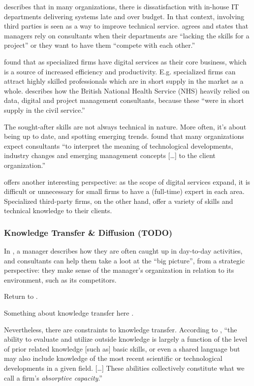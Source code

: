 \documentclass[12pt]{article}
\begin{document}
\citet[12]{lacity1994} describes that in many organizations, there is
dissatisfaction with in-house IT departments delivering systems late and
over budget. In that context, involving third parties is seen as a way
to improve technical service. \citet[233]{sturdy1998} agrees and states
that managers rely on consultants when their departments are ``lacking
the skills for a project'' or they want to have them ``compete with each
other.''

\citet[52]{aubert1996} found that as specialized firms have digital
services as their core business, which is a source of increased
efficiency and productivity. E.g. specialized firms can attract highly
skilled professionals which are in short supply in the market as a
whole. \citet[28]{mazzucato2023} describes how the British National
Health Service (NHS) heavily relied on data, digital and project
management consultants, because these ``were in short supply in the
civil service.''

The sought-after skills are not always technical in nature. More often,
it's about being up to date, and spotting emerging trends.
\citet[53]{werr2002} found that many organizations expect consultants
``to interpret the meaning of technological developments, industry
changes and emerging management concepts {[}\ldots{]} to the client
organization.''

\citet[452]{ketler1993} offers another interesting perspective: as the
scope of digital services expand, it is difficult or unnecessary for
small firms to have a (full-time) expert in each area. Specialized
third-party firms, on the other hand, offer a variety of skills and
technical knowledge to their clients.

\subsubsection{Knowledge Transfer \& Diffusion
(TODO)}\label{knowledge-transfer-diffusion-todo}

In \citet[53]{werr2002}, a manager describes how they are often caught
up in day-to-day activities, and consultants can help them take a loot
at the ``big picture'', from a strategic perspective: they make sense of
the manager's organization in relation to its environment, such as its
competitors.

Return to \citet{turner1982}.

Something about knowledge transfer here \citep{sturdy2009}.

Nevertheless, there are constraints to knowledge transfer. According to
\citet[128-129]{cohen1990}, ``the ability to evaluate and utilize
outside knowledge is largely a function of the level of prior related
knowledge {[}such as{]} basic skills, or even a shared language but may
also include knowledge of the most recent scientific or technological
developments in a given field. {[}\ldots{]} These abilities collectively
constitute what we call a firm's \emph{absorptive capacity}.''
\end{document}
